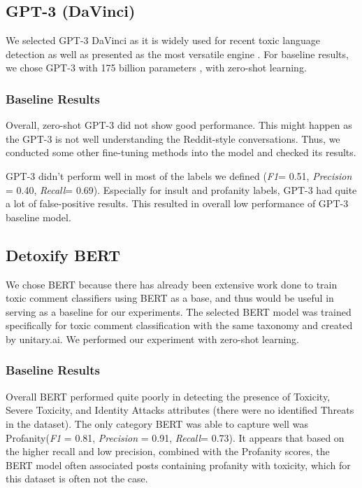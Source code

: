 \documentclass[11pt]{article}
\begin{document}
\subsection{GPT-3 (DaVinci)}
We selected GPT-3 DaVinci as it is widely used for recent toxic language detection as well as presented as the most versatile engine \citep{gehman2020, zhou2021, baheti2021}.  For baseline results, we chose GPT-3 with 175 billion parameters \citep{brown2020}, with zero-shot learning.
\subsubsection{Baseline Results}
Overall, zero-shot GPT-3 did not show good performance. This might happen as the GPT-3 is not well understanding the Reddit-style conversations. Thus, we conducted some other fine-tuning methods into the model and checked its results. 

GPT-3 didn’t perform well in most of the labels we defined (\emph{F1}= 0.51, \emph{Precision} =  0.40, \emph{Recall}= 0.69). Especially for insult and profanity labels, GPT-3 had quite a lot of false-positive results. This resulted in overall low performance of GPT-3 baseline model. 

\subsection{Detoxify BERT}
We chose BERT because there has already been extensive work done to train toxic comment classifiers using BERT as a base, and thus would be useful in serving as a baseline for our experiments.  The selected BERT model was trained specifically for toxic comment classification with the same taxonomy and created by unitary.ai. We performed our experiment with zero-shot learning.

\subsubsection{Baseline Results}
Overall BERT performed quite poorly in detecting the presence of Toxicity, Severe Toxicity, and Identity Attacks attributes (there were no identified Threats in the dataset).  The only category BERT was able to capture well was Profanity(\emph{F1} = 0.81, \emph{Precision} =  0.91, \emph{Recall}= 0.73). It appears that based on the higher recall and low precision, combined with the Profanity scores, the BERT model often associated posts containing profanity with toxicity, which for this dataset is often not the case.
\end{document}
